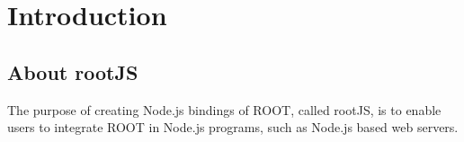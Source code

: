 \chapter{Introduction}
\section{About rootJS}
The purpose of creating Node.js bindings of ROOT, called rootJS, is to enable users to 
integrate ROOT in Node.js programs, such as Node.js based web servers. 